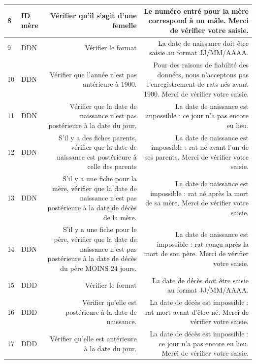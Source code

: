 \documentclass[a4paper,10pt]{article}
\begin{document}
\begin{tabularx}{\textwidth}{|l|l|R|R|}
8 & ID mère & Vérifier qu'il s'agit d'une femelle & Le numéro entré pour la mère correspond à un mâle. Merci de vérifier votre saisie. \\\hline


9 & DDN & Vérifier le format & La date de naissance doit être saisie au format JJ/MM/AAAA.\\\hline


10 & DDN & Vérifier que l'année n'est pas antérieure à 1900. & Pour des raisons de fiabilité des données, nous n'acceptons pas l'enregistrement de rats nés avant 1900. Merci de vérifier votre saisie.\\\hline


11 & DDN & Vérifier que la date de naissance n'est pas postérieure à la date du jour.& La date de naissance est impossible : ce jour n'a pas encore eu lieu.\\\hline


12 & DDN & S'il y a des fiches parents, vérifier que la date de naissance est postérieure à celle des parents & La date de naissance est impossible : rat né avant l'un de ses parents. Merci de vérifier votre saisie.\\\hline


13 & DDN & S'il y a une fiche pour la mère, vérifier que la date de naissance n'est pas postérieure à la date de décès de la mère. & La date de naissance est impossible : rat né après la mort de sa mère. Merci de vérifier votre saisie.\\\hline


14 & DDN & S'il y a une fiche pour le père, vérifier que la date de naissance n'est pas postérieure à la date de décès du père MOINS 24 jours. & La date de naissance est impossible : rat conçu après la mort de son père. Merci de vérifier votre saisie.\\\hline


15 & DDD & Vérifier le format & La date de décès doit être saisie au format JJ/MM/AAAA.\\\hline


16 & DDD & Vérifier qu'elle est postérieure à la date de naissance. & La date de décès est impossible : rat mort avant d'être né. Merci de vérifier votre saisie.\\\hline


17 & DDD & Vérifier qu'elle est antérieure à la date du jour. & La date de décès est impossible : ce jour n'a pas encore eu lieu. Merci de vérifier votre saisie.\\\hline



\end{tabularx}
\end{document}
